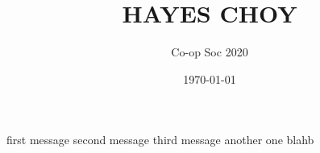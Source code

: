 \documentclass{article}%
\title{HAYES CHOY}%
\author{Co{-}op Soc 2020}%
\date{\today}%
\begin{document}
%
\normalsize%
first message%
second message%
third message%
another one%
blahb%
\end{document}
